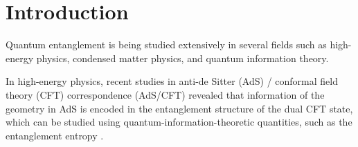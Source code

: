 \documentclass[%
twocolumn, 
secnumarabic,amssymb, preprintnumbers, superscriptaddress, aps, prl]{revtex4-1}
\begin{document}
\section{Introduction}
Quantum entanglement is being studied extensively in several fields such as high-energy physics, condensed matter physics, and quantum information theory.%

In high-energy physics, recent studies in anti-de Sitter (AdS) / conformal field theory (CFT) correspondence \cite{1999IJTP...38.1113M} (AdS/CFT) revealed that information of the geometry in AdS is encoded in the entanglement structure of the dual CFT state, which can be studied using quantum-information-theoretic quantities, such as the entanglement entropy  \cite{Ryu_2006,Ryu_20062}.
\end{document}
